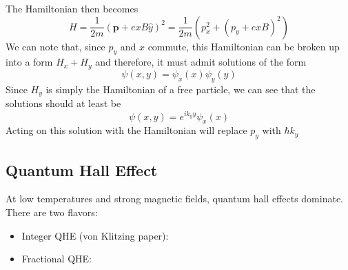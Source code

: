 \documentclass[10pt]{article}
\begin{document}
The Hamiltonian then becomes
$$
H = \frac{1}{2m}(\textbf{p} + exB\hat{y})^{2} = \frac{1}{2m}\left ( p_{x}^{2} + (p_{y} + exB)^{2}\right )
$$
We can note that, since $p_{y}$ and $x$ commute, this Hamiltonian can be broken up into a form $H_{x} + H_{y}$ and
therefore, it must admit solutions of the form
$$\psi(x,y) = \psi_{x}(x)\psi_{y}(y)$$
Since $H_{y}$ is simply the Hamiltonian of a free particle, we can see that the solutions should at least be
$$
\psi(x,y) = e^{ik_{y}y}\psi_{x}(x)
$$
Acting on this solution with the Hamiltonian will replace $p_{y}$ with $\hbar k_{y}$
\subsection{Quantum Hall Effect}

At low temperatures and strong magnetic fields, quantum hall effects dominate. There are two flavors:
\begin{itemize}
  \item Integer QHE (von Klitzing paper):
  \item Fractional QHE:
\end{itemize}
\end{document}
